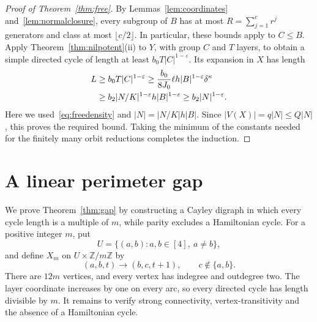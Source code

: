 \documentclass[11pt,a4paper,reqno]{amsart}
\theoremstyle{definition}
\theoremstyle{remark}
\numberwithin{equation}{section}
\newcommand{\Z}{\mathbb Z}
\newcommand{\eps}{\varepsilon}
\begin{document}
\begin{proof}[Proof of Theorem~\ref{thm:free}]
By Lemmas~\ref{lem:coordinates} and~\ref{lem:normalclosure}, every subgroup of $B$ has at most $R=\sum_{j=1}^c r^j$ generators and class at most $\lfloor c/2\rfloor$. In particular, these bounds apply to $C\le B$. Apply Theorem~\ref{thm:nilpotent}(ii) to $Y$, with group $C$ and $T$ layers, to obtain a simple directed cycle of length at least $b_0T|C|^{1-\eps}$. Its expansion in $X$ has length
\begin{align}\label{eq:freelength}
 L&\ge b_0T|C|^{1-\eps}
 \ge\frac{b_0}{8J_0}\ell h|B|^{1-\eps}\delta^\kappa\notag\\
 &\ge b_2|N/K|^{1-\eps}h|B|^{1-\eps}
 \ge b_2|N|^{1-\eps}.
\end{align}
Here we used~\eqref{eq:freedensity} and $|N|=|N/K|h|B|$. Since $|V(X)|=q|N|\le Q|N|$, this proves the required bound. Taking the minimum of the constants needed for the finitely many orbit reductions completes the induction.
\end{proof}

\section{A linear perimeter gap}\label{sec:gap}
We prove Theorem~\ref{thm:gap} by constructing a Cayley digraph in which every cycle length is a multiple of $m$, while parity excludes a Hamiltonian cycle. For a positive integer $m$, put
\[
 U=\{(a,b):a,b\in[4],\ a\ne b\},
\]
and define $X_m$ on $U\times\Z/m\Z$ by
\begin{equation}\label{eq:construction}
 (a,b,t)\longrightarrow(b,c,t+1),\qquad c\notin\{a,b\}.
\end{equation}
There are $12m$ vertices, and every vertex has indegree and outdegree two. The layer coordinate increases by one on every arc, so every directed cycle has length divisible by $m$. It remains to verify strong connectivity, vertex-transitivity and the absence of a Hamiltonian cycle.
\end{document}
